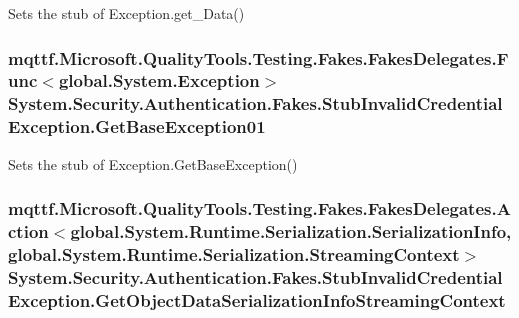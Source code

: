 Sets the stub of Exception.\-get\-\_\-\-Data()

\hypertarget{class_system_1_1_security_1_1_authentication_1_1_fakes_1_1_stub_invalid_credential_exception_a0dd3c688dc41bf856d2fca28d61fab04}{
\subsubsection[{Get\-Base\-Exception01}]{\setlength{\rightskip}{0pt plus 5cm}mqttf.\-Microsoft.\-Quality\-Tools.\-Testing.\-Fakes.\-Fakes\-Delegates.\-Func$<$global.\-System.\-Exception$>$ System.\-Security.\-Authentication.\-Fakes.\-Stub\-Invalid\-Credential\-Exception.\-Get\-Base\-Exception01}}\label{class_system_1_1_security_1_1_authentication_1_1_fakes_1_1_stub_invalid_credential_exception_a0dd3c688dc41bf856d2fca28d61fab04}


Sets the stub of Exception.\-Get\-Base\-Exception()

\hypertarget{class_system_1_1_security_1_1_authentication_1_1_fakes_1_1_stub_invalid_credential_exception_a73f494237d503a74a74ce8374ae721de}{
\subsubsection[{Get\-Object\-Data\-Serialization\-Info\-Streaming\-Context}]{\setlength{\rightskip}{0pt plus 5cm}mqttf.\-Microsoft.\-Quality\-Tools.\-Testing.\-Fakes.\-Fakes\-Delegates.\-Action$<$global.\-System.\-Runtime.\-Serialization.\-Serialization\-Info, global.\-System.\-Runtime.\-Serialization.\-Streaming\-Context$>$ System.\-Security.\-Authentication.\-Fakes.\-Stub\-Invalid\-Credential\-Exception.\-Get\-Object\-Data\-Serialization\-Info\-Streaming\-Context}}\label{class_system_1_1_security_1_1_authentication_1_1_fakes_1_1_stub_invalid_credential_exception_a73f494237d503a74a74ce8374ae721de}


